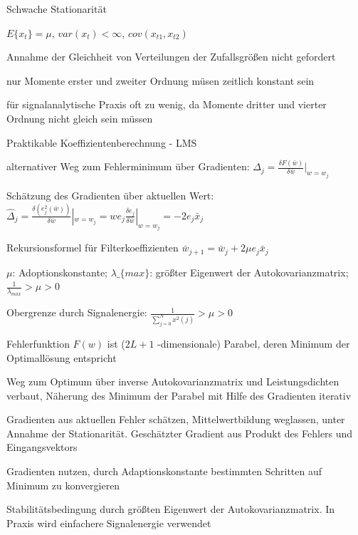 \documentclass[a4paper]{article}
\begin{document}
\begin{multicols}{3}
  Schwache Stationarität
  \begin{itemize*}
    \item $E\{x_t\}=\mu$, $var(x_t)<\infty$, $cov(x_{t1}, x_{t2})$
    \item Annahme der Gleichheit von Verteilungen der Zufallsgrößen nicht gefordert
    \item nur Momente erster und zweiter Ordnung müsen zeitlich konstant sein
    \item für signalanalytische Praxis oft zu wenig, da Momente dritter und vierter Ordnung nicht gleich sein müssen%
  \end{itemize*}

  Praktikable Koeffizientenberechnung - LMS
  \begin{itemize*}
    \item alternativer Weg zum Fehlerminimum über Gradienten: $\Delta_j=\frac{\delta F(\bar{w})}{\delta \bar{w}}|_{w=w_j}$
    \item Schätzung des Gradienten über aktuellen Wert: $\hat{\Delta}_j=\frac{\delta(e_j^2(\bar{w}))}{\delta \bar{w}}|_{w=w_j} =we_j \frac{\delta e_j}{\delta \bar{w}}|_{w=w_j}=-2e_j \bar{x}_j$
    \item Rekursionsformel für Filterkoeffizienten $\bar{w}_{j+1}=\bar{w}_j + 2\mu e_j \bar{x}_j$
    \item $\mu$: Adoptionskonstante; $\lambda\_\{max\}$: größter Eigenwert der Autokovarianzmatrix; $\frac{1}{\lambda_{max}}>\mu >0$
    \item Obergrenze durch Signalenergie: $\frac{1}{\sum_{j=0}^N x^2(j)}>\mu >0$
    \item Fehlerfunktion $F(w)$ ist ($2L+1$ -dimensionale) Parabel, deren Minimum der Optimallösung entspricht%
    \item Weg zum Optimum über inverse Autokovarianzmatrix und Leistungsdichten verbaut, Näherung des Minimum der Parabel mit Hilfe des Gradienten iterativ%
    \item Gradienten aus aktuellen Fehler schätzen, Mittelwertbildung weglassen, unter Annahme der Stationarität. Geschätzter Gradient aus Produkt des Fehlers und Eingangsvektors
    \item Gradienten nutzen, durch Adaptionskonstante bestimmten Schritten auf Minimum zu konvergieren
    \item Stabilitätsbedingung durch größten Eigenwert der Autokovarianzmatrix. In Praxis wird einfachere Signalenergie verwendet%
  \end{itemize*}


\end{multicols}
\end{document}
